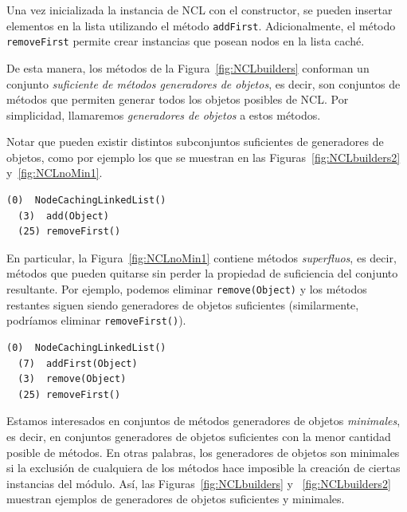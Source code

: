Una vez inicializada la instancia de NCL con el constructor, se pueden insertar elementos en la lista utilizando el método \texttt{addFirst}. Adicionalmente, el método \texttt{removeFirst} permite crear instancias que posean nodos en la lista caché. 

De esta manera, los métodos de la Figura~\ref{fig:NCLbuilders} conforman un conjunto \emph{suficiente de métodos generadores de objetos}, es decir, son conjuntos de métodos que permiten generar todos los objetos posibles de NCL. Por simplicidad, llamaremos \emph{generadores de objetos} a estos métodos.

Notar que pueden existir distintos subconjuntos suficientes de generadores de objetos, como por ejemplo los que se muestran en las Figuras~\ref{fig:NCLbuilders2} y~\ref{fig:NCLnoMin1}. 
\vspace{5pt} 
\begin{lstlisting}[numbers=none,label=fig:NCLbuilders2, caption=Otros métodos generadores de objetos, frame=tb , basicstyle=\scriptsize, xleftmargin=0pt]
  (0)  NodeCachingLinkedList()
  (3)  add(Object)
  (25) removeFirst()
\end{lstlisting}


En particular, la Figura~\ref{fig:NCLnoMin1} contiene métodos \emph{superfluos}, es decir, métodos que pueden quitarse sin perder la propiedad de suficiencia del conjunto resultante. Por ejemplo, podemos eliminar \texttt{remove(Object)} y los métodos restantes siguen siendo generadores de objetos suficientes (similarmente, podríamos eliminar \texttt{removeFirst()}). 
\vspace{5pt} 

\begin{lstlisting}[numbers=none,label=fig:NCLnoMin1, caption=Métodos generadores de objetos suficientes pero no minimales, captionpos=b, frame=tb , xleftmargin=0pt, basicstyle=\scriptsize]
  (0)  NodeCachingLinkedList()
  (7)  addFirst(Object)
  (3)  remove(Object)
  (25) removeFirst()
\end{lstlisting}

Estamos interesados en conjuntos de métodos generadores de objetos \emph{minimales}, es decir, en conjuntos generadores de objetos suficientes con la menor cantidad posible de métodos. En otras palabras, los generadores de objetos son minimales si la exclusión de cualquiera de los métodos hace imposible la creación de ciertas instancias del módulo.
Así, las Figuras~\ref{fig:NCLbuilders} y ~\ref{fig:NCLbuilders2} muestran ejemplos de generadores de objetos suficientes y minimales.

